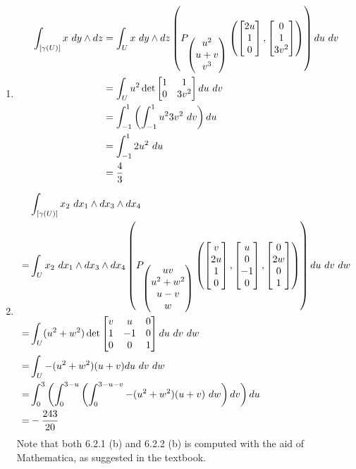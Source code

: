\documentclass{homework}
\begin{document}
\begin{problem}{2}
  \begin{enumerate}
    \item
    \begin{align*}
      \int_{[\gamma(U)]} x\ dy\land dz &=
      \int_U x\ dy\land dz
        \left(
        P_{\begin{pmatrix}u^2 \\ u + v \\ v^3\end{pmatrix}}
          \left(
            \begin{bmatrix}2u \\ 1 \\ 0\end{bmatrix},
            \begin{bmatrix}0  \\ 1 \\ 3v^2\end{bmatrix}
          \right)
        \right) du\ dv
        \\ &=
      \int_U u^2 \det \begin{bmatrix}1 & 1 \\ 0 & 3v^2\end{bmatrix} du\ dv \\ &=
      \int_{-1}^1
        \left( \int_{-1}^1 u^2 3v^2\ dv \right)
        du \\ &=
      \int_{-1}^1 2u^2\ du \\ &=
      \dfrac{4}{3}
    \end{align*}
    \item
    \begin{align*} &
      \int_{[\gamma(U)]} x_2\ dx_1 \land dx_3 \land dx_4 \\ =&
      \int_U x_2\ dx_1 \land dx_3 \land dx_4
        \left( P_{\begin{pmatrix}uv \\ u^2+w^2 \\ u-v \\ w\end{pmatrix}}
          \left(
            \begin{bmatrix}v \\ 2u \\  1 \\ 0\end{bmatrix},
            \begin{bmatrix}u \\  0 \\ -1 \\ 0\end{bmatrix},
            \begin{bmatrix}0 \\ 2w \\  0 \\ 1\end{bmatrix}
          \right)
        \right) du\ dv\ dw \\ =&
      \int_U (u^2+w^2)
        \det \begin{bmatrix}v & u & 0 \\ 1 & -1 & 0 \\ 0 & 0 & 1\end{bmatrix}
        du\ dv\ dw \\ =&
      \int_U -(u^2+w^2)(u+v) du\ dv\ dw \\ =&
      \int_0^3 \left(
        \int_0^{3-u} \left(
          \int_0^{3-u-v} -(u^2+w^2)(u+v)\ dw
        \right) dv
      \right) du \\ =&
      -\dfrac{243}{20}
    \end{align*}
    Note that both 6.2.1 (b) and 6.2.2 (b) is computed with the aid of
    Mathematica, as suggested in the textbook.
  \end{enumerate}
\end{problem}
\end{document}
